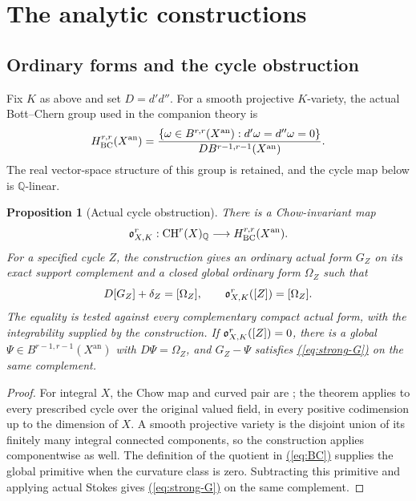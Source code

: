 \documentclass[11pt,a4paper]{article}
\newtheorem{proposition}[theorem]{Proposition}
\theoremstyle{definition}
\theoremstyle{remark}\newtheorem{remark}[theorem]{Remark}
\numberwithin{equation}{section}
\newcommand{\Q}{\mathbb Q}\newcommand{\R}{\mathbb R}\newcommand{\C}{\mathbb C}
\newcommand{\CH}{\operatorname{CH}}\newcommand{\an}{\mathrm{an}}
\renewcommand{\eqref}[1]{\hyperref[#1]{\textcolor{equationlink}{(\ref*{#1})}}}
\begin{document}
\section{The analytic constructions}\label{sec:analytic}

\subsection{Ordinary forms and the cycle obstruction}\label{sub:obstruction}

Fix $K$ as above and set $D=d'd''$. For a smooth projective $K$-variety,
the actual Bott--Chern group used in the companion theory is
\begin{equation}\label{eq:BC}
 H_{\BC}^{r,r}(X^{\an})=
 \frac{\{\omega\in B^{r,r}(X^{\an}):d'\omega=d''\omega=0\}}
 {D B^{r-1,r-1}(X^{\an})}.
\end{equation}
The real vector-space structure of this group is retained, and the
cycle map below is $\Q$-linear.

\begin{proposition}[Actual cycle obstruction]\label{prop:obstruction}
There is a Chow-invariant map
\[
 \ob^r_{X,K}:\CH^r(X)_\Q\longrightarrow H_{\BC}^{r,r}(X^{\an}).
\]
For a specified cycle $Z$, the construction gives an ordinary actual
form $G_Z$ on its exact support complement and a closed global ordinary
form $\Omega_Z$ such that
\begin{equation}\label{eq:curved}
       D[G_Z]+\delta_Z=[\Omega_Z],
       \qquad \mathfrak o^r_{X,K}([Z])=[\Omega_Z].
\end{equation}
The equality is tested against every complementary compact actual form,
with the integrability supplied by the construction. If
$\mathfrak o^r_{X,K}([Z])=0$, there is a global
$\Psi\in B^{r-1,r-1}(X^{\an})$ with $D\Psi=\Omega_Z$, and
$G_Z-\Psi$ satisfies \eqref{eq:strong-G} on the same complement.
\end{proposition}

\begin{proof}
For integral $X$, the Chow map and curved pair are
\cite[Theorem 1.1]{ChowGreenPairs}; the theorem applies to every
prescribed cycle over the original valued field, in every positive
codimension up to the dimension of $X$. A smooth projective variety
is the disjoint union of its finitely many integral connected
components, so the construction applies componentwise as well.
The definition of the quotient in \eqref{eq:BC} supplies the global
primitive when the curvature class is zero. Subtracting this
primitive and applying actual Stokes gives \eqref{eq:strong-G} on
the same complement.
\end{proof}
\end{document}
